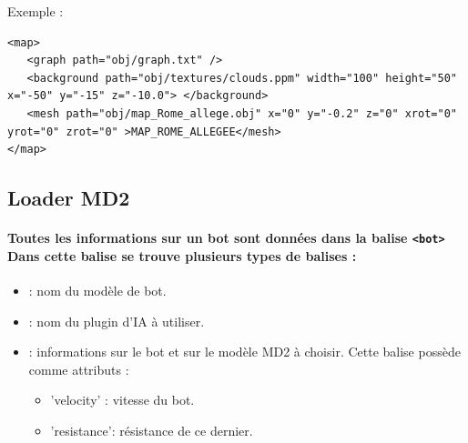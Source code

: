 \vspace{1cm}

Exemple :

\begin{scriptsize}\begin{verbatim}
<map>
   <graph path="obj/graph.txt" />
   <background path="obj/textures/clouds.ppm" width="100" height="50" x="-50" y="-15" z="-10.0"> </background>
   <mesh path="obj/map_Rome_allege.obj" x="0" y="-0.2" z="0" xrot="0" yrot="0" zrot="0" >MAP_ROME_ALLEGEE</mesh>
</map>
\end{verbatim}\end{scriptsize}



\vspace{1cm}
\subsection{Loader MD2}
\vspace{0.5cm}


\paragraph{Toutes les informations sur un bot sont données dans la balise \verb?<bot>? Dans cette balise se trouve plusieurs types de balises :}
\begin{itemize}
	\item[\verb?<name>?] : nom du modèle de bot.
	\item[\verb?<brain>?] : nom du plugin d'IA à utiliser.
	\item[\verb?<body>?] : informations sur le bot et sur le modèle MD2 à choisir. Cette balise possède comme attributs :
 	\begin{itemize}
 		\item 'velocity' : vitesse du bot.
		\item 'resistance': résistance de ce dernier.
	\end{itemize}
\end{itemize}

\vspace{1cm}

